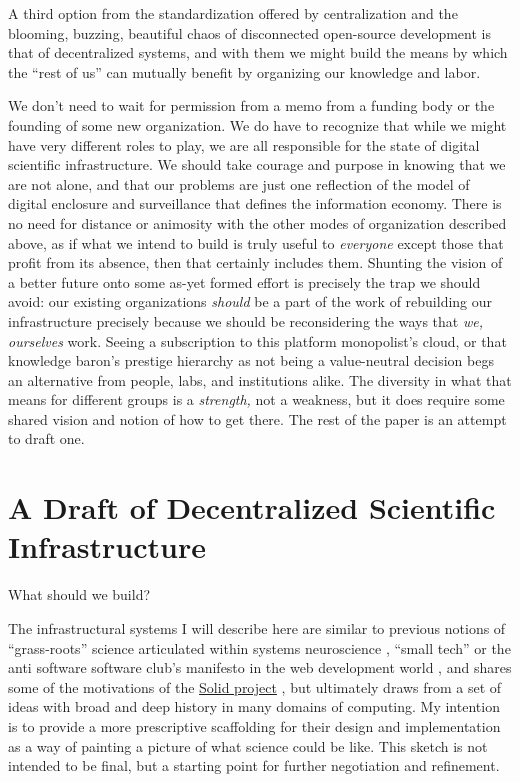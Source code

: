 A third option from the standardization offered by centralization and
the blooming, buzzing, beautiful chaos of disconnected open-source
development is that of decentralized systems, and with them we might
build the means by which the ``rest of us'' can mutually benefit by
organizing our knowledge and labor.

We don't need to wait for permission from a memo from a funding body or
the founding of some new organization. We do have to recognize that
while we might have very different roles to play, we are all responsible
for the state of digital scientific infrastructure. We should take
courage and purpose in knowing that we are not alone, and that our
problems are just one reflection of the model of digital enclosure and
surveillance that defines the information economy. There is no need for
distance or animosity with the other modes of organization described
above, as if what we intend to build is truly useful to \emph{everyone}
except those that profit from its absence, then that certainly includes
them. Shunting the vision of a better future onto some as-yet formed
effort is precisely the trap we should avoid: our existing organizations
\emph{should} be a part of the work of rebuilding our infrastructure
precisely because we should be reconsidering the ways that \emph{we,
ourselves} work. Seeing a subscription to this platform monopolist's
cloud, or that knowledge baron's prestige hierarchy as not being a
value-neutral decision begs an alternative from people, labs, and
institutions alike. The diversity in what that means for different
groups is a \emph{strength,} not a weakness, but it does require some
shared vision and notion of how to get there. The rest of the paper is
an attempt to draft one.

\hypertarget{a-draft-of-decentralized-scientific-infrastructure}{%
\chapter{A Draft of Decentralized Scientific
Infrastructure}\label{a-draft-of-decentralized-scientific-infrastructure}}

What should we build?

The infrastructural systems I will describe here are similar to previous
notions of ``grass-roots'' science articulated within systems
neuroscience \citep{mainenBetterWayCrack2016} , ``small tech''
\citep{balkanSmallTechnologyFoundation}  or the anti software
software club's manifesto \citep{kaplanPartAntisoftwareAction2020}  in the web development world , and shares some of the motivations
of the \href{https://solidproject.org/}{Solid project} \citep{sambraSolidPlatformDecentralized2016} , but ultimately draws from a
set of ideas with broad and deep history in many domains of computing.
My intention is to provide a more prescriptive scaffolding for their
design and implementation as a way of painting a picture of what science
could be like. This sketch is not intended to be final, but a starting
point for further negotiation and refinement.

